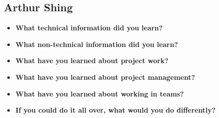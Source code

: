 \documentclass[onecolumn, draftclsnofoot,10pt, compsoc]{IEEEtran}
\begin{document}
\subsection{Arthur Shing}
\begin{itemize}
\item{\textbf{What technical information did you learn?}}

\item{\textbf{What non-technical information did you learn?}}

\item{\textbf{What have you learned about project work?}}

\item{\textbf{What have you learned about project management?}}


\item{\textbf{What have you learned about working in teams?}}


\item{\textbf{If you could do it all over, what would you do differently?}}
\end{itemize}





\pagebreak
\clearpage
\end{document}
